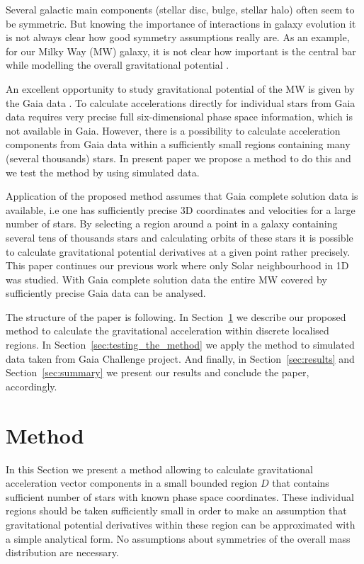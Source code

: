 \documentclass[fleqn,usenatbib]{mnras}
\begin{document}
Several galactic main components (stellar disc, bulge, stellar halo) often seem to be symmetric. But knowing the importance of interactions in galaxy evolution it is not always clear how good symmetry assumptions really are. As an example, for our Milky Way (MW) galaxy, it is not clear how important is the central bar while modelling the overall gravitational potential \citep[e.g.][]{Binney:2018}. 

An excellent opportunity to study gravitational potential of the MW is given by the Gaia data \citep{Gaia_DR2}. To calculate accelerations directly for individual stars from Gaia data requires very precise full six-dimensional phase space information, which is not available in Gaia. However, there is a possibility to calculate acceleration components from Gaia data within a sufficiently small regions containing many (several thousands) stars. In present paper we propose a method to do this and we test the method by using simulated data.  

Application of the proposed method assumes that Gaia complete solution data is available, i.e one has  sufficiently precise 3D coordinates and velocities for a large number of stars. By selecting a region around a point in a galaxy containing several tens of thousands stars and calculating orbits of these stars it is possible to calculate gravitational potential derivatives at a given point rather precisely. This paper continues our previous work \citep{Kipper:2018} where only Solar neighbourhood in 1D was studied. With Gaia complete solution data the entire MW covered by sufficiently precise Gaia data can be analysed.

The structure of the paper is following. In Section~\ref{sec:method} we describe our proposed method to calculate the gravitational acceleration within discrete localised regions. In Section~\ref{sec:testing_the_method} we apply the method to simulated data taken from Gaia Challenge project. And finally, in Section~\ref{sec:results} and Section~\ref{sec:summary} we present our results and conclude the paper, accordingly.


\section{Method} 
\label{sec:method}

In this Section we present a method allowing to calculate gravitational acceleration  vector components in a small bounded region $D$ that contains sufficient number of stars with known phase space coordinates. These individual regions should be taken sufficiently small in order to make an assumption that gravitational potential derivatives within these region can be approximated with a simple analytical form. No assumptions about symmetries of the overall mass distribution are necessary. 
\end{document}
